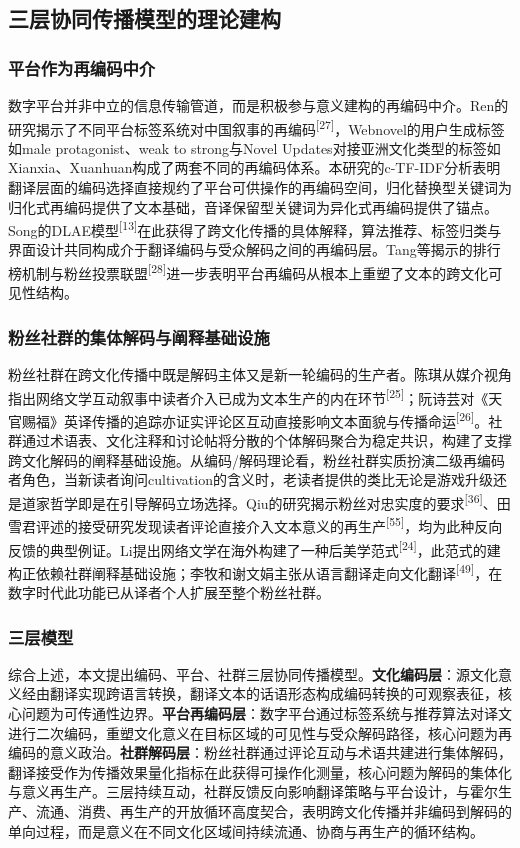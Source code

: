 \documentclass[12pt, a4paper]{article}
\newcommand{\citemark}[1]{\textsuperscript{[#1]}}
\begin{document}
\subsection{三层协同传播模型的理论建构}

\subsubsection{平台作为再编码中介}

数字平台并非中立的信息传输管道，而是积极参与意义建构的再编码中介。Ren的研究揭示了不同平台标签系统对中国叙事的再编码\citemark{27}，Webnovel的用户生成标签如male protagonist、weak to strong与Novel Updates对接亚洲文化类型的标签如Xianxia、Xuanhuan构成了两套不同的再编码体系。本研究的c-TF-IDF分析表明翻译层面的编码选择直接规约了平台可供操作的再编码空间，归化替换型关键词为归化式再编码提供了文本基础，音译保留型关键词为异化式再编码提供了锚点。Song的DLAE模型\citemark{13}在此获得了跨文化传播的具体解释，算法推荐、标签归类与界面设计共同构成介于翻译编码与受众解码之间的再编码层。Tang等揭示的排行榜机制与粉丝投票联盟\citemark{28}进一步表明平台再编码从根本上重塑了文本的跨文化可见性结构。

\subsubsection{粉丝社群的集体解码与阐释基础设施}

粉丝社群在跨文化传播中既是解码主体又是新一轮编码的生产者。陈琪从媒介视角指出网络文学互动叙事中读者介入已成为文本生产的内在环节\citemark{25}；阮诗芸对《天官赐福》英译传播的追踪亦证实评论区互动直接影响文本面貌与传播命运\citemark{26}。社群通过术语表、文化注释和讨论帖将分散的个体解码聚合为稳定共识，构建了支撑跨文化解码的阐释基础设施。从编码/解码理论看，粉丝社群实质扮演二级再编码者角色，当新读者询问cultivation的含义时，老读者提供的类比无论是游戏升级还是道家哲学即是在引导解码立场选择。Qiu的研究揭示粉丝对忠实度的要求\citemark{36}、田雪君评述的接受研究发现读者评论直接介入文本意义的再生产\citemark{55}，均为此种反向反馈的典型例证。Li提出网络文学在海外构建了一种后美学范式\citemark{24}，此范式的建构正依赖社群阐释基础设施；李牧和谢文娟主张从语言翻译走向文化翻译\citemark{49}，在数字时代此功能已从译者个人扩展至整个粉丝社群。

\subsubsection{三层模型}

综合上述，本文提出编码、平台、社群三层协同传播模型。\textbf{文化编码层}：源文化意义经由翻译实现跨语言转换，翻译文本的话语形态构成编码转换的可观察表征，核心问题为可传通性边界。\textbf{平台再编码层}：数字平台通过标签系统与推荐算法对译文进行二次编码，重塑文化意义在目标区域的可见性与受众解码路径，核心问题为再编码的意义政治。\textbf{社群解码层}：粉丝社群通过评论互动与术语共建进行集体解码，翻译接受作为传播效果量化指标在此获得可操作化测量，核心问题为解码的集体化与意义再生产。三层持续互动，社群反馈反向影响翻译策略与平台设计，与霍尔生产、流通、消费、再生产的开放循环高度契合，表明跨文化传播并非编码到解码的单向过程，而是意义在不同文化区域间持续流通、协商与再生产的循环结构。
\end{document}

